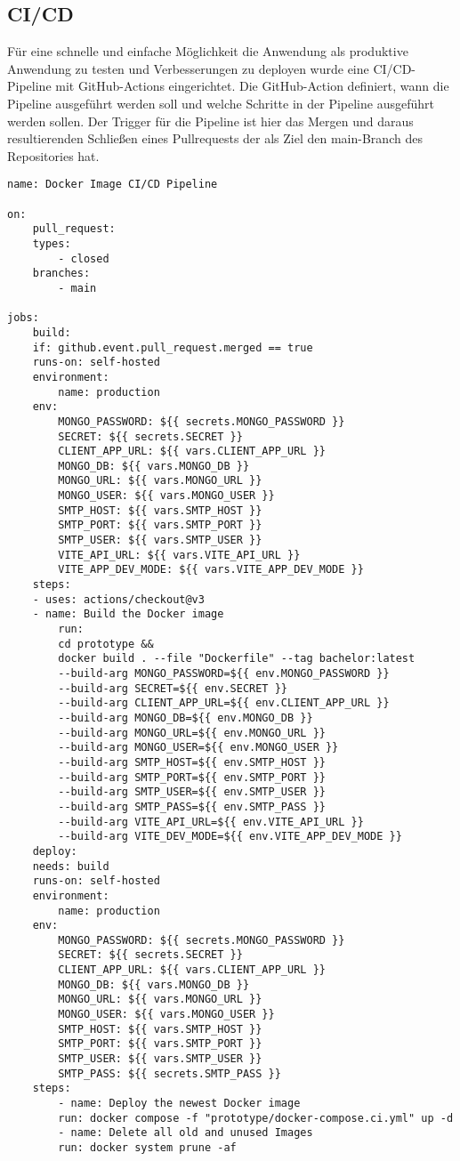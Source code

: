 \subsection{CI/CD}
Für eine schnelle und einfache Möglichkeit die Anwendung als produktive Anwendung zu testen und Verbesserungen zu deployen wurde eine CI/CD-Pipeline mit GitHub-Actions eingerichtet. Die GitHub-Action definiert, wann die Pipeline ausgeführt werden soll und welche Schritte in der Pipeline ausgeführt werden sollen. Der Trigger für die Pipeline ist hier das Mergen und daraus resultierenden Schließen eines Pullrequests der als Ziel den main-Branch des Repositories hat.

\begin{lstlisting}[caption=GitHub-Action]
name: Docker Image CI/CD Pipeline

on:
    pull_request:
    types:
        - closed
    branches:
        - main

jobs:
    build:
    if: github.event.pull_request.merged == true
    runs-on: self-hosted 
    environment: 
        name: production
    env:
        MONGO_PASSWORD: ${{ secrets.MONGO_PASSWORD }}
        SECRET: ${{ secrets.SECRET }}
        CLIENT_APP_URL: ${{ vars.CLIENT_APP_URL }}
        MONGO_DB: ${{ vars.MONGO_DB }}
        MONGO_URL: ${{ vars.MONGO_URL }}
        MONGO_USER: ${{ vars.MONGO_USER }}
        SMTP_HOST: ${{ vars.SMTP_HOST }}
        SMTP_PORT: ${{ vars.SMTP_PORT }}
        SMTP_USER: ${{ vars.SMTP_USER }}
        VITE_API_URL: ${{ vars.VITE_API_URL }}
        VITE_APP_DEV_MODE: ${{ vars.VITE_APP_DEV_MODE }}
    steps:
    - uses: actions/checkout@v3
    - name: Build the Docker image
        run: 
        cd prototype && 
        docker build . --file "Dockerfile" --tag bachelor:latest 
        --build-arg MONGO_PASSWORD=${{ env.MONGO_PASSWORD }}
        --build-arg SECRET=${{ env.SECRET }}
        --build-arg CLIENT_APP_URL=${{ env.CLIENT_APP_URL }}
        --build-arg MONGO_DB=${{ env.MONGO_DB }}
        --build-arg MONGO_URL=${{ env.MONGO_URL }}
        --build-arg MONGO_USER=${{ env.MONGO_USER }}
        --build-arg SMTP_HOST=${{ env.SMTP_HOST }}
        --build-arg SMTP_PORT=${{ env.SMTP_PORT }}
        --build-arg SMTP_USER=${{ env.SMTP_USER }}
        --build-arg SMTP_PASS=${{ env.SMTP_PASS }}
        --build-arg VITE_API_URL=${{ env.VITE_API_URL }}
        --build-arg VITE_DEV_MODE=${{ env.VITE_APP_DEV_MODE }}
    deploy:
    needs: build
    runs-on: self-hosted
    environment: 
        name: production
    env:
        MONGO_PASSWORD: ${{ secrets.MONGO_PASSWORD }}
        SECRET: ${{ secrets.SECRET }}
        CLIENT_APP_URL: ${{ vars.CLIENT_APP_URL }}
        MONGO_DB: ${{ vars.MONGO_DB }}
        MONGO_URL: ${{ vars.MONGO_URL }}
        MONGO_USER: ${{ vars.MONGO_USER }}
        SMTP_HOST: ${{ vars.SMTP_HOST }}
        SMTP_PORT: ${{ vars.SMTP_PORT }}
        SMTP_USER: ${{ vars.SMTP_USER }}
        SMTP_PASS: ${{ secrets.SMTP_PASS }}
    steps:
        - name: Deploy the newest Docker image
        run: docker compose -f "prototype/docker-compose.ci.yml" up -d
        - name: Delete all old and unused Images
        run: docker system prune -af
\end{lstlisting}

